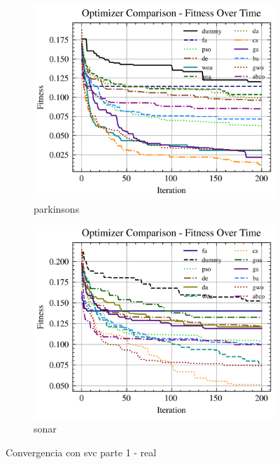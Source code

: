\begin{figure}[htp]
\begin{subfigure}[htp]{0.45\textwidth}
        \includegraphics[width=\textwidth]{imagenes/fitness_charts/img/real/parkinsons/optimizers_fitness_svc.png}
        \caption{parkinsons}
    \end{subfigure}
    \begin{subfigure}[htp]{0.45\textwidth}
        \includegraphics[width=\textwidth]{imagenes/fitness_charts/img/real/sonar/optimizers_fitness_svc.png}
        \caption{sonar}
    \end{subfigure}
    \caption{Convergencia con svc parte 1 - real}
    \label{fig:convergencia_svc_1_real}
\end{figure}

